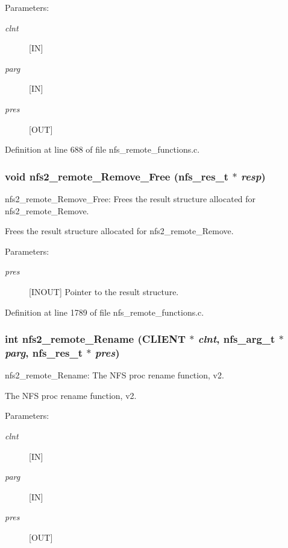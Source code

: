 \begin{Desc}
\item[Parameters:]
\begin{description}
\item[{\em clnt}][IN] \item[{\em parg}][IN] \item[{\em pres}][OUT] \end{description}
\end{Desc}


Definition at line 688 of file nfs\_\-remote\_\-functions.c.
\subsubsection{\setlength{\rightskip}{0pt plus 5cm}void nfs2\_\-remote\_\-Remove\_\-Free (nfs\_\-res\_\-t $\ast$ {\em resp})}\label{group__NFSprocs_ga63}


nfs2\_\-remote\_\-Remove\_\-Free: Frees the result structure allocated for nfs2\_\-remote\_\-Remove.

Frees the result structure allocated for nfs2\_\-remote\_\-Remove.

\begin{Desc}
\item[Parameters:]
\begin{description}
\item[{\em pres}][INOUT] Pointer to the result structure. \end{description}
\end{Desc}


Definition at line 1789 of file nfs\_\-remote\_\-functions.c.
\subsubsection{\setlength{\rightskip}{0pt plus 5cm}int nfs2\_\-remote\_\-Rename (CLIENT $\ast$ {\em clnt}, nfs\_\-arg\_\-t $\ast$ {\em parg}, nfs\_\-res\_\-t $\ast$ {\em pres})}\label{group__NFSprocs_ga11}


nfs2\_\-remote\_\-Rename: The NFS proc rename function, v2.

The NFS proc rename function, v2.

\begin{Desc}
\item[Parameters:]
\begin{description}
\item[{\em clnt}][IN] \item[{\em parg}][IN] \item[{\em pres}][OUT] \end{description}
\end{Desc}


